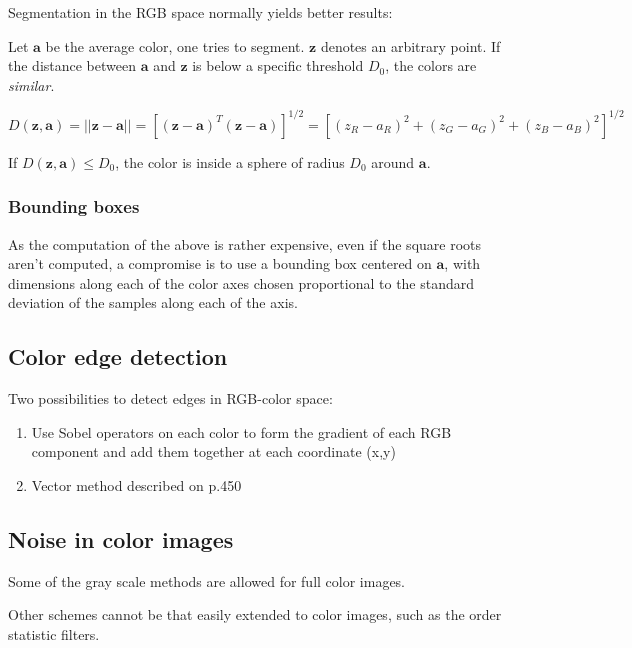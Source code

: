 Segmentation in the RGB space normally yields better results:

Let $\mathbf{a}$ be the average color, one tries to segment. $\mathbf{z}$ denotes an arbitrary point. If the distance between $\mathbf{a}$ and $\mathbf{z}$ is below a specific threshold $D_0$, the colors are \textit{similar}.

\begin{equation}
	D(\mathbf{z},\mathbf{a}) = \left|\left| \mathbf{z}-\mathbf{a} \right|\right| = \left[(\mathbf{z}-\mathbf{a})^T(\mathbf{z}-\mathbf{a})\right]^{1/2} = \left[ (z_R-a_R)^2 + (z_G-a_G)^2 + (z_B-a_B)^2 \right]^{1/2}
\end{equation}

If $D(\mathbf{z},\mathbf{a}) \leq D_0$, the color is inside a sphere of radius $D_0$ around $\mathbf{a}$.

\subsubsection{Bounding boxes }
As the computation of the above is rather expensive, even if the square roots aren't computed, a compromise is to use a bounding box centered on $\mathbf{a}$, with dimensions along each of the color axes chosen proportional to the standard deviation of the samples along each of the axis.

\subsection{Color edge detection }
Two possibilities to detect edges in RGB-color space:
\begin{enumerate}
	\item Use Sobel operators on each color to form the gradient of each RGB component and add them together at each coordinate (x,y)
	\item Vector method described on p.450
\end{enumerate}

\subsection{Noise in color images }
Some of the gray scale methods are allowed for full color images.

Other schemes cannot be that easily extended to color images, such as the order statistic filters.
